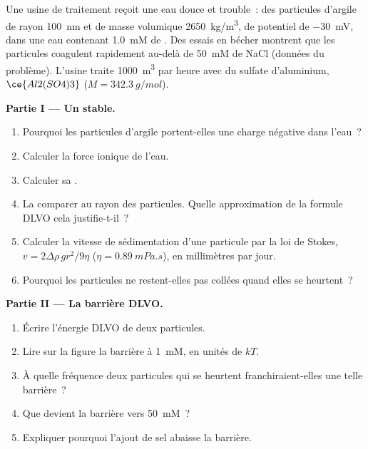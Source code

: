 \begin{problem}
\label{pb:b3:colloids:1}
Une usine de traitement reçoit une eau douce et trouble~: des particules
d'argile de rayon
\qty{100}{nm} et de masse volumique \qty{2650}{kg/m^3}, de potentiel de
 \qty{-30}{mV}, dans une eau contenant \qty{1.0}{mM} de
. Des essais en bécher montrent que les particules coagulent
rapidement au-delà de \qty{50}{mM} de NaCl (données du problème). L'usine
traite \qty{1000}{m^3} par
heure avec du sulfate d'aluminium, $\ce{Al2(SO4)3}$ ($M = \qty{342.3}{g/mol}$).

\medskip\noindent\textbf{Partie I --- Un  stable.}
\begin{enumerate}
  \item Pourquoi les particules d'argile portent-elles une charge
        négative dans l'eau~?
  \item Calculer la force ionique de l'eau.
  \item Calculer sa .
  \item La comparer au rayon des particules. Quelle approximation de la
        formule DLVO cela justifie-t-il~?
  \item Calculer la vitesse de sédimentation d'une particule par la loi
        de Stokes, $v =
        2\Delta\rho\,gr^2/9\eta$ ($\eta = \qty{0.89}{mPa.s}$), en
        millimètres par jour.
  \item Pourquoi les particules ne restent-elles pas collées quand elles
        se heurtent~?
\end{enumerate}

\medskip\noindent\textbf{Partie II --- La barrière DLVO.}
\begin{enumerate}[resume]
  \item Écrire l'énergie DLVO de deux particules.
  \item Lire sur la figure la barrière à \qty{1}{mM}, en unités de $kT$.
  \item À quelle fréquence deux particules qui se heurtent
        franchiraient-elles une telle barrière~?
  \item Que devient la barrière vers \qty{50}{mM}~?
  \item Expliquer pourquoi l'ajout de sel abaisse la barrière.
\end{enumerate}


\end{problem}
